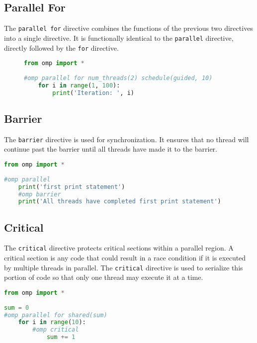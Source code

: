 \documentclass[letterpaper,12pt]{article} %
\begin{document}
\subsection{Parallel For}
The \texttt{parallel for} directive combines the functions of the previous two directives into a single directive. It is functionally identical to the \texttt{parallel} directive, directly followed by the \texttt{for} directive.

\begin{figure}[H]
\begin{lstlisting}[language=Python]
from omp import *
 
#omp parallel for num_threads(2) schedule(guided, 10)
	for i in range(1, 100):
		print('Iteration: ', i)
\end{lstlisting}
\end{figure}

 
 \subsection{Barrier}
 The \texttt{barrier} directive is used for synchronization. It ensures that no thread will continue past the barrier until all threads have made it to the barrier. 
  
 \begin{lstlisting}[language=Python]
from omp import *
 
#omp parallel
	print('first print statement')
	#omp barrier
	print('All threads have completed first print statement')
\end{lstlisting} 



 \subsection{Critical}
 The \texttt{critical} directive protects critical sections within a parallel region. A critical section is any code that could result in a race condition if it is executed by multiple threads in parallel. The \texttt{critical} directive is used to serialize this portion of code so that only one thread may execute it at a time. 
 
 \begin{lstlisting}[language=Python]
from omp import *
 
sum = 0
#omp parallel for shared(sum)
	for i in range(10):
		#omp critical
			sum += 1
\end{lstlisting}
\end{document}
